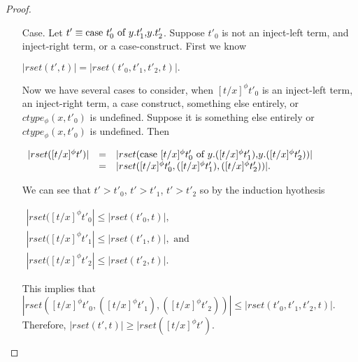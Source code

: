 \begin{proof}
\begin{itemize}
\item[Case.] 
  Let $t' \equiv \mbox{case}\ t'_0\ \text{of}\ y\text{.}t'_1\text{,}y\text{.}t'_2$.  Suppose $t'_0$ is not an inject-left term, and inject-right term,
  or a case-construct.  First we know 
  \begin{center}
    \begin{math}
      |rset(t', t)| = |rset(t'_0, t'_1, t'_2, t)|.
    \end{math}
  \end{center}
  Now we have several cases to consider, when $[t/x]^\phi t'_0$ is an inject-left term,
  an inject-right term, a case construct, something else entirely, or $ctype_\phi(x,t'_0)$ is undefined. Suppose it is something else entirely or
  $ctype_\phi(x,t'_0)$ is undefined.
  Then 
  \begin{center}
    \begin{math}
      \begin{array}{lll}
        |rset([t/x]^\phi t')| & = & |rset(\mbox{case}\ [t/x]^\phi t'_0\ \text{of}\ y\text{.}([t/x]^\phi t'_1)\text{,}y\text{.}([t/x]^\phi t'_2))|\\
        & = & |rset([t/x]^\phi t'_0,([t/x]^\phi t'_1),([t/x]^\phi t'_2))|.
      \end{array}
    \end{math}
  \end{center}
  We can see that $t' > t'_0$, $t' > t'_1$, $t' > t'_2$ so by the induction hyothesis
  \begin{center}
    \begin{math}
      \begin{array}{lll}
        |rset([t/x]^\phi t'_0| \leq |rset(t'_0, t)|,\\
        |rset([t/x]^\phi t'_1| \leq |rset(t'_1, t)|, \text{ and }\\
        |rset([t/x]^\phi t'_2| \leq |rset(t'_2, t)|.
      \end{array}
    \end{math}
  \end{center}
  This implies that $|rset([t/x]^\phi t'_0,([t/x]^\phi t'_1),([t/x]^\phi t'_2))| \leq |rset(t'_0,t'_1,t'_2,t)|$.
  Therefore, $|rset(t', t)| \geq |rset([t/x]^\phi t')$.
  

\end{itemize}
\end{proof}
